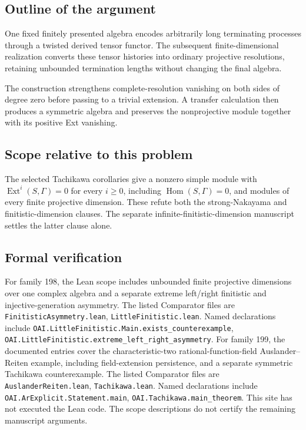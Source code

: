 \documentclass[11pt]{article}
\begin{document}
\subsection{Outline of the argument}
One fixed finitely presented algebra encodes arbitrarily long terminating processes through a twisted derived tensor functor. The subsequent finite-dimensional realization converts these tensor histories into ordinary projective resolutions, retaining unbounded termination lengths without changing the final algebra.

The construction strengthens complete-resolution vanishing on both sides of degree zero before passing to a trivial extension. A transfer calculation then produces a symmetric algebra and preserves the nonprojective module together with its positive Ext vanishing.

\subsection{Scope relative to this problem}
The selected Tachikawa corollaries give a nonzero simple module with $\operatorname{Ext}^i(S,\Gamma)=0$ for every $i\ge0$, including $\operatorname{Hom}(S,\Gamma)=0$, and modules of every finite projective dimension. These refute both the strong-Nakayama and finitistic-dimension clauses. The separate infinite-finitistic-dimension manuscript settles the latter clause alone.

\subsection{Formal verification}
For family 198, the Lean scope includes unbounded finite projective dimensions over one complex algebra and a separate extreme left/right finitistic and injective-generation asymmetry. The listed Comparator files are \texttt{FinitisticAsymmetry.lean}, \texttt{LittleFinitistic.lean}. Named declarations include \texttt{OAI.LittleFinitistic.Main.exists\_counterexample}, \texttt{OAI.LittleFinitistic.extreme\_left\_right\_asymmetry}. For family 199, the documented entries cover the characteristic-two rational-function-field Auslander--Reiten example, including field-extension persistence, and a separate symmetric Tachikawa counterexample. The listed Comparator files are \texttt{AuslanderReiten.lean}, \texttt{Tachikawa.lean}. Named declarations include \texttt{OAI.ArExplicit.Statement.main}, \texttt{OAI.Tachikawa.main\_theorem}. This site has not executed the Lean code. The scope descriptions do not certify the remaining manuscript arguments.
\end{document}
